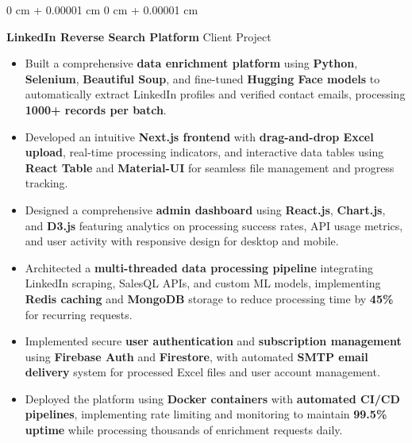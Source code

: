 \documentclass[10pt, letterpaper]{article}
\newenvironment{highlights}{
    \begin{itemize}[
        topsep=0.10 cm,
        parsep=0.10 cm,
        partopsep=0pt,
        itemsep=0pt,
        leftmargin=0 cm + 10pt
    ]
}{
    \end{itemize}
} %
\newenvironment{onecolentry}{
    \begin{adjustwidth}{
        0 cm + 0.00001 cm
    }{
        0 cm + 0.00001 cm
    }
}{
    \end{adjustwidth}
} %
\begin{document}
\begin{onecolentry}
	\textbf{LinkedIn Reverse Search Platform} \hfill Client Project
	\begin{highlights}
		\item Built a comprehensive \textbf{data enrichment platform} using \textbf{Python}, \textbf{Selenium}, \textbf{Beautiful Soup}, and fine-tuned \textbf{Hugging Face models} to automatically extract LinkedIn profiles and verified contact emails, processing \textbf{1000+ records per batch}.
		\item Developed an intuitive \textbf{Next.js frontend} with \textbf{drag-and-drop Excel upload}, real-time processing indicators, and interactive data tables using \textbf{React Table} and \textbf{Material-UI} for seamless file management and progress tracking.
		\item Designed a comprehensive \textbf{admin dashboard} using \textbf{React.js}, \textbf{Chart.js}, and \textbf{D3.js} featuring analytics on processing success rates, API usage metrics, and user activity with responsive design for desktop and mobile.
		\item Architected a \textbf{multi-threaded data processing pipeline} integrating LinkedIn scraping, SalesQL APIs, and custom ML models, implementing \textbf{Redis caching} and \textbf{MongoDB} storage to reduce processing time by \textbf{45\%} for recurring requests.
		\item Implemented secure \textbf{user authentication} and \textbf{subscription management} using \textbf{Firebase Auth} and \textbf{Firestore}, with automated \textbf{SMTP email delivery} system for processed Excel files and user account management.
		\item Deployed the platform using \textbf{Docker containers} with \textbf{automated CI/CD pipelines}, implementing rate limiting and monitoring to maintain \textbf{99.5\% uptime} while processing thousands of enrichment requests daily.
	\end{highlights}
\end{onecolentry}


\vspace{0.15 cm}
\end{document}
